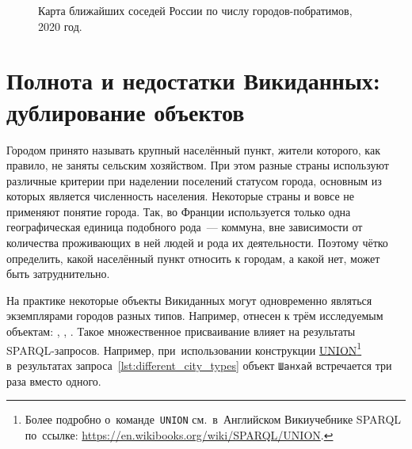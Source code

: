 \begin{figure}[h]
{
\setlength{\fboxsep}{0pt}%
\setlength{\fboxrule}{1pt}%
}
	\caption{Карта ближайших соседей России по числу городов-побратимов, 2020 год.}
	\label{fig:Map_closest_neighbours_Russia}
\end{figure}







\section{Полнота и недостатки Викиданных: дублирование объектов}
\label{sect:city-completness}

Городом принято называть крупный населённый пункт, 
жители которого, как правило, не заняты сельским хозяйством. 
При этом разные страны используют различные критерии 
при наделении поселений статусом города, 
основным из которых является численность населения. 
Некоторые страны и вовсе не применяют понятие города. 
Так, во Франции используется только одна географическая единица подобного рода~--- коммуна, 
вне зависимости от количества проживающих в ней людей и рода их деятельности. 
Поэтому чётко определить, какой населённый пункт относить к городам, а какой нет, может быть затруднительно.

На практике некоторые объекты Викиданных могут одновременно являться экземплярами городов разных типов. 
Например,  отнесен к трём исследуемым объектам: 
, , . 
Такое множественное присваивание влияет на результаты SPARQL-запросов. 
Например, 
при~использовании конструкции \href{https://en.wikibooks.org/wiki/SPARQL/UNION}{UNION}\footnote[][-15pt]{%
%
Более подробно о~команде~\lstinline|UNION| 
см.~в~Английском Викиучебнике SPARQL по~ссылке: \href{https://en.wikibooks.org/wiki/SPARQL/UNION}{https://en.wikibooks.org/wiki/SPARQL/UNION}.%
}%
в~результатах запроса~\ref{lst:different_city_types} 
объект \lstinline|Шанхай| встречается три раза вместо одного. 

